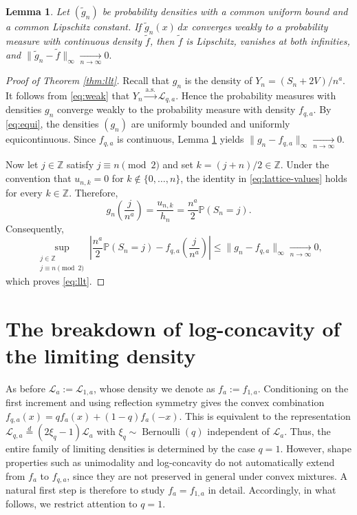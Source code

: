 \documentclass[11pt]{article}
\numberwithin{equation}{section}
\newtheorem{lemma}[theorem]{Lemma}
\theoremstyle{remark}
\newcommand{\Pp}{\mathbb{P}}
\begin{document}
\begin{lemma}\label{lem:upgrade}
Let $(\tilde g_n)$ be probability densities with a common uniform bound and a common
Lipschitz constant. If $\tilde g_n(x)\,dx$ converges weakly to a probability measure
with continuous density $\tilde f$, then $\tilde f$ is Lipschitz, vanishes at both infinities,
and
$\|\tilde g_n- \tilde f\|_\infty \xrightarrow[n\to \infty]{} 0.$
\end{lemma}

\begin{proof}[Proof of Theorem \ref{thm:llt}]
Recall that $g_n$ is the density of $Y_n=(S_n+2V)/n^a$. It follows from \eqref{eq:weak} that
$Y_n\xrightarrow{\mathrm{a.s.}}\mathcal{L}_{q,a}$.
Hence the probability measures with densities $g_n$ converge weakly
to the probability measure with density $f_{q,a}$. By \eqref{eq:equi}, the densities $(g_n)$ are uniformly bounded and
uniformly equicontinuous. Since $f_{q,a}$ is continuous, Lemma \ref{lem:upgrade} yields
$\|g_n-f_{q,a}\|_\infty \xrightarrow[n\to \infty]{} 0$.

Now let $j\in\mathbb{Z}$ satisfy $j\equiv n\pmod 2$ and set
$k=(j+n)/2\in\mathbb{Z}$. Under the convention that $u_{n,k}=0$ for
$k\notin\{0,\ldots,n\}$, the identity in
\eqref{eq:lattice-values} holds for every $k\in\mathbb{Z}$. Therefore,
\[
g_n\left(\frac{j}{n^a}\right)
=
\frac{u_{n,k}}{h_n}
=
\frac{n^a}{2}\Pp(S_n=j).
\]
Consequently,
\[
\sup_{\substack{j\in\mathbb{Z}\\ j\equiv n\pmod 2}}
\left|
\frac{n^a}{2}\Pp(S_n=j)
-
f_{q,a}\left(\frac{j}{n^a}\right)
\right|
\leq
\|g_n-f_{q,a}\|_\infty
\xrightarrow[n\to \infty]{} 0,
\]
which proves \eqref{eq:llt}. 
\end{proof}

\section{The breakdown of log-concavity of the limiting density}

As before $\mathcal{L}_a := \mathcal{L}_{1,a}$, whose density we denote as $f_a:=f_{1,a}$. Conditioning on the first increment and using reflection symmetry gives
the convex combination $f_{q,a}(x)=qf_{a}(x)+(1-q)f_{a}(-x)$. This is equivalent to the representation
$\mathcal{L}_{q,a}\stackrel{d}{=}(2\xi_q-1)\mathcal{L}_a$ with $\xi_q\sim\operatorname{Bernoulli}(q)$ independent of $\mathcal{L}_a$. Thus, the entire family of limiting densities is
determined by the case $q=1$. However, shape properties such as unimodality and log-concavity do not
automatically extend from $f_a$ to $f_{q,a}$, since they are not
preserved in general under convex mixtures. A natural first step is
therefore to study $f_a=f_{1,a}$ in detail. Accordingly, in what
follows, we restrict attention to $q=1$.
\end{document}
